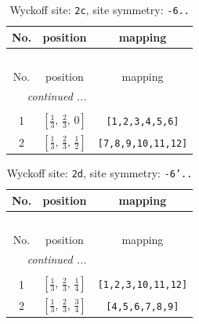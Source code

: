 \documentclass[fleqn,8pt]{jsarticle}
\begin{document}
\renewcommand{\arraystretch}{1.2}
\begin{longtable}{ccc}
\caption{Wyckoff site: {\tt 2c}, site symmetry: {\tt -6..}}
 \\
 \hline \hline
No. & position & mapping \\ \hline \endfirsthead

\multicolumn{2}{l}{\tablename\ \thetable{}} \\
 \hline \hline
No. & position & mapping \\ \hline \endhead

 \hline \hline
\multicolumn{2}{r}{\footnotesize\it continued ...} \\ \endfoot

 \hline \hline
\multicolumn{2}{r}{} \\ \endlastfoot

1 & $\left[ \frac{1}{3},\, \frac{2}{3},\, 0 \right]$ & {\tt [1,2,3,4,5,6]} \\ \hline
2 & $\left[ \frac{1}{3},\, \frac{2}{3},\, \frac{1}{2} \right]$ & {\tt [7,8,9,10,11,12]} \\
\end{longtable}
\renewcommand{\arraystretch}{1.2}
\begin{longtable}{ccc}
\caption{Wyckoff site: {\tt 2d}, site symmetry: {\tt -6'..}}
 \\
 \hline \hline
No. & position & mapping \\ \hline \endfirsthead

\multicolumn{2}{l}{\tablename\ \thetable{}} \\
 \hline \hline
No. & position & mapping \\ \hline \endhead

 \hline \hline
\multicolumn{2}{r}{\footnotesize\it continued ...} \\ \endfoot

 \hline \hline
\multicolumn{2}{r}{} \\ \endlastfoot

1 & $\left[ \frac{1}{3},\, \frac{2}{3},\, \frac{1}{4} \right]$ & {\tt [1,2,3,10,11,12]} \\ \hline
2 & $\left[ \frac{1}{3},\, \frac{2}{3},\, \frac{3}{4} \right]$ & {\tt [4,5,6,7,8,9]} \\
\end{longtable}
\renewcommand{\arraystretch}{1.2}
\end{document}
